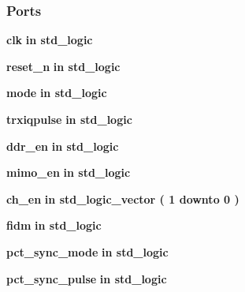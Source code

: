 \subsubsection*{Ports}
 \begin{DoxyCompactItemize}
\item 
{\bf clk}  {\bfseries {\bfseries \textcolor{keywordflow}{in}\textcolor{vhdlchar}{ }}} {\bfseries \textcolor{comment}{std\+\_\+logic}\textcolor{vhdlchar}{ }} 
\item 
{\bf reset\+\_\+n}  {\bfseries {\bfseries \textcolor{keywordflow}{in}\textcolor{vhdlchar}{ }}} {\bfseries \textcolor{comment}{std\+\_\+logic}\textcolor{vhdlchar}{ }} 
\item 
{\bf mode}  {\bfseries {\bfseries \textcolor{keywordflow}{in}\textcolor{vhdlchar}{ }}} {\bfseries \textcolor{comment}{std\+\_\+logic}\textcolor{vhdlchar}{ }} 
\item 
{\bf trxiqpulse}  {\bfseries {\bfseries \textcolor{keywordflow}{in}\textcolor{vhdlchar}{ }}} {\bfseries \textcolor{comment}{std\+\_\+logic}\textcolor{vhdlchar}{ }} 
\item 
{\bf ddr\+\_\+en}  {\bfseries {\bfseries \textcolor{keywordflow}{in}\textcolor{vhdlchar}{ }}} {\bfseries \textcolor{comment}{std\+\_\+logic}\textcolor{vhdlchar}{ }} 
\item 
{\bf mimo\+\_\+en}  {\bfseries {\bfseries \textcolor{keywordflow}{in}\textcolor{vhdlchar}{ }}} {\bfseries \textcolor{comment}{std\+\_\+logic}\textcolor{vhdlchar}{ }} 
\item 
{\bf ch\+\_\+en}  {\bfseries {\bfseries \textcolor{keywordflow}{in}\textcolor{vhdlchar}{ }}} {\bfseries \textcolor{comment}{std\+\_\+logic\+\_\+vector}\textcolor{vhdlchar}{ }\textcolor{vhdlchar}{(}\textcolor{vhdlchar}{ }\textcolor{vhdlchar}{ } \textcolor{vhdldigit}{1} \textcolor{vhdlchar}{ }\textcolor{keywordflow}{downto}\textcolor{vhdlchar}{ }\textcolor{vhdlchar}{ } \textcolor{vhdldigit}{0} \textcolor{vhdlchar}{ }\textcolor{vhdlchar}{)}\textcolor{vhdlchar}{ }} 
\item 
{\bf fidm}  {\bfseries {\bfseries \textcolor{keywordflow}{in}\textcolor{vhdlchar}{ }}} {\bfseries \textcolor{comment}{std\+\_\+logic}\textcolor{vhdlchar}{ }} 
\item 
{\bf pct\+\_\+sync\+\_\+mode}  {\bfseries {\bfseries \textcolor{keywordflow}{in}\textcolor{vhdlchar}{ }}} {\bfseries \textcolor{comment}{std\+\_\+logic}\textcolor{vhdlchar}{ }} 
\item 
{\bf pct\+\_\+sync\+\_\+pulse}  {\bfseries {\bfseries \textcolor{keywordflow}{in}\textcolor{vhdlchar}{ }}} {\bfseries \textcolor{comment}{std\+\_\+logic}\textcolor{vhdlchar}{ }} 

\end{DoxyCompactItemize}
